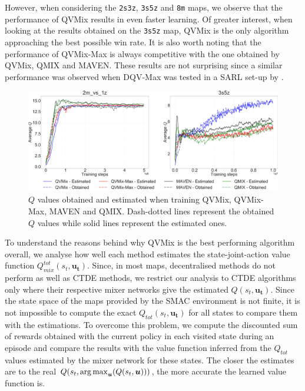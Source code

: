 However, when considering the \texttt{2s3z}, \texttt{3s5z} and \texttt{8m} maps, we observe that the performance of QVMix results in even faster learning. 
Of greater interest, when looking at the results obtained on the \texttt{3s5z} map, QVMix is the only algorithm approaching the best possible win rate.
It is also worth noting that the performance of QVMix-Max is always competitive with the one obtained by QVMix, QMIX and MAVEN.
These results are not surprising since a similar performance was observed when DQV-Max was tested in a SARL set-up by \cite{sabatelli2020deep}.

\begin{figure}
\centering
\includegraphics[width=.95\linewidth]{tex_thesis/figures/ch4/2m1z3s5zQ.pdf}
\caption{$Q$ values obtained and estimated when training QVMix, QVMix-Max, MAVEN and QMIX. Dash-dotted lines represent the obtained $Q$ values while solid lines represent the estimated ones.}
\label{fig:exp_plots_overestim:q_best_worse}
\end{figure}

To understand the reasons behind why QVMix is the best performing algorithm overall, we analyse how well each method estimates the state-joint-action value function $Q_{mix}^{tot}(s_t, \mathbf{u_t})$. 
Since, in most maps, decentralised methods do not perform as well as CTDE methods, we restrict our analysis to CTDE algorithms only where their respective mixer networks give the estimated $Q(s_t, \mathbf{u_t})$.
Since the state space of the maps provided by the SMAC environment is not finite, it is not impossible to compute the exact $Q_{tot}(s_t, \mathbf{u_t})$ for all states to compare them with the estimations.
To overcome this problem, we compute the discounted sum of rewards obtained with the current policy in each visited state during an episode and compare the results with the value function inferred from the $Q_{tot}$ values estimated by the mixer network for these states.
The closer the estimates are to the real $Q(s_t, \argmax_{\mathbf{u}}(Q(s_t,\mathbf{u})))$, the more accurate the learned value function is.


